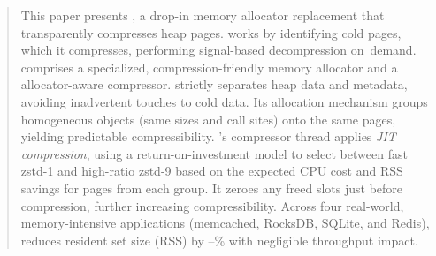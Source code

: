 \begin{abstract}
This paper presents \sys, a drop-in memory allocator replacement that
transparently compresses heap pages. \sys works by identifying cold
pages, which it compresses, performing signal-based decompression
on~demand.  \sys comprises a specialized, compression-friendly memory
allocator and a allocator-aware compressor.  \sys strictly separates
heap data and metadata, avoiding inadvertent touches to cold data. Its
allocation mechanism groups homogeneous objects (same sizes and call
sites) onto the same pages, yielding predictable
compressibility. \sys's compressor thread applies \emph{JIT
compression}, using a return-on-investment model to select between
fast zstd-1 and high-ratio zstd-9 based on the expected CPU cost and
RSS savings for pages from each group. It zeroes any freed slots just
before compression, further increasing compressibility. Across
four real-world, memory-intensive applications (memcached, RocksDB,
SQLite, and Redis), \sys reduces resident set size (RSS) by
\rssRedMin--\rssRedMax\% with negligible throughput impact.
\end{abstract}
